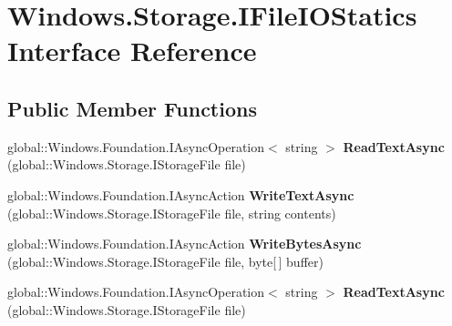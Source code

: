 \hypertarget{interface_windows_1_1_storage_1_1_i_file_i_o_statics}{}\section{Windows.\+Storage.\+I\+File\+I\+O\+Statics Interface Reference}
\label{interface_windows_1_1_storage_1_1_i_file_i_o_statics}
\subsection*{Public Member Functions}
\begin{DoxyCompactItemize}
\item 
\mbox{\label{interface_windows_1_1_storage_1_1_i_file_i_o_statics_a8b4c0f9fe8b0238779101b3f516c0f69}} 
global\+::\+Windows.\+Foundation.\+I\+Async\+Operation$<$ string $>$ {\bfseries Read\+Text\+Async} (global\+::\+Windows.\+Storage.\+I\+Storage\+File file)
\item 
\mbox{\label{interface_windows_1_1_storage_1_1_i_file_i_o_statics_ac3b1c12a4964c9e4aac34a8555d76db6}} 
global\+::\+Windows.\+Foundation.\+I\+Async\+Action {\bfseries Write\+Text\+Async} (global\+::\+Windows.\+Storage.\+I\+Storage\+File file, string contents)
\item 
\mbox{\label{interface_windows_1_1_storage_1_1_i_file_i_o_statics_a280b21167530e3370e010a055af41c65}} 
global\+::\+Windows.\+Foundation.\+I\+Async\+Action {\bfseries Write\+Bytes\+Async} (global\+::\+Windows.\+Storage.\+I\+Storage\+File file, byte\mbox{[}$\,$\mbox{]} buffer)
\item 
\mbox{\label{interface_windows_1_1_storage_1_1_i_file_i_o_statics_a8b4c0f9fe8b0238779101b3f516c0f69}} 
global\+::\+Windows.\+Foundation.\+I\+Async\+Operation$<$ string $>$ {\bfseries Read\+Text\+Async} (global\+::\+Windows.\+Storage.\+I\+Storage\+File file)
\item 
\mbox{\label{interface_windows_1_1_storage_1_1_i_file_i_o_statics_ac3b1c12a4964c9e4aac34a8555d76db6}} 

\end{DoxyCompactItemize}
